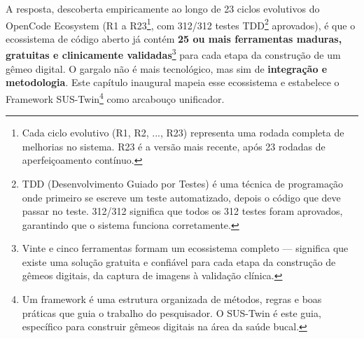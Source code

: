 A resposta, descoberta empiricamente ao longo de 23 ciclos evolutivos do OpenCode Ecosystem (R1 a R23\footnote[3]{Cada ciclo evolutivo (R1, R2, ..., R23) representa uma rodada completa de melhorias no sistema. R23 é a versão mais recente, após 23 rodadas de aperfeiçoamento contínuo.}, com 312/312 testes TDD\footnote[4]{TDD (Desenvolvimento Guiado por Testes) é uma técnica de programação onde primeiro se escreve um teste automatizado, depois o código que deve passar no teste. 312/312 significa que todos os 312 testes foram aprovados, garantindo que o sistema funciona corretamente.} aprovados), é que o ecossistema de código aberto já contém \textbf{25 ou mais ferramentas maduras, gratuitas e clinicamente validadas}\footnote[5]{Vinte e cinco ferramentas formam um ecossistema completo — significa que existe uma solução gratuita e confiável para cada etapa da construção de gêmeos digitais, da captura de imagens à validação clínica.} para cada etapa da construção de um gêmeo digital. O gargalo não é mais tecnológico, mas sim de \textbf{integração e metodologia}. Este capítulo inaugural mapeia esse ecossistema e estabelece o Framework SUS-Twin\footnote[6]{Um framework é uma estrutura organizada de métodos, regras e boas práticas que guia o trabalho do pesquisador. O SUS-Twin é este guia, específico para construir gêmeos digitais na área da saúde bucal.} como arcabouço unificador.

